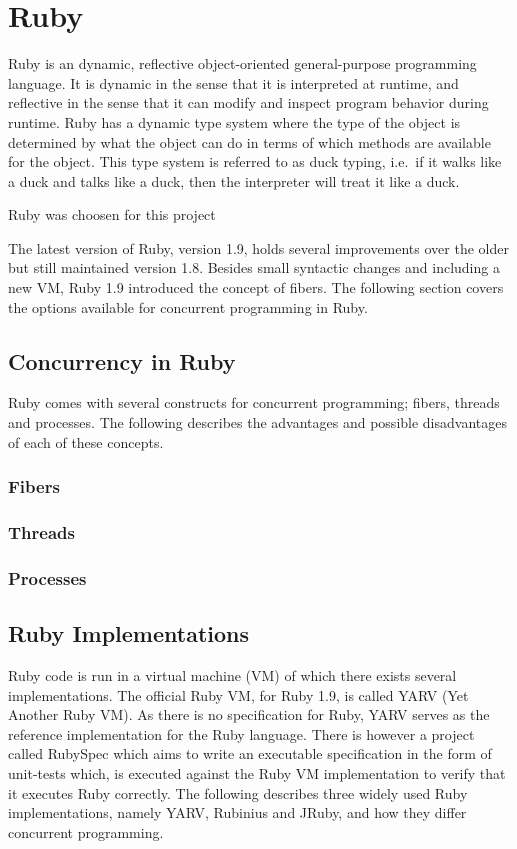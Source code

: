 \section{Ruby} %
\label{sec:ruby}

Ruby is an dynamic, reflective object-oriented general-purpose programming
language. It is dynamic in the sense that it is interpreted at runtime, and
reflective in the sense that it can modify and inspect program behavior during
runtime.  Ruby has a dynamic type system where the type of the object is
determined by what the object can do in terms of which methods are available
for the object. This type system is referred to as duck typing, i.e.\ if it
walks like a duck and talks like a duck, then the interpreter will treat it
like a duck.

Ruby was choosen for this project

The latest version of Ruby, version 1.9, holds several improvements over the
older but still maintained version 1.8. Besides small syntactic changes and
including a new VM, Ruby 1.9 introduced the concept of fibers.  The following
section covers the options available for concurrent programming in Ruby.

\subsection{Concurrency in Ruby}
Ruby comes with several constructs for concurrent programming; fibers, threads
and processes. The following describes the advantages and possible disadvantages
of each of these concepts.

\subsubsection{Fibers}

\subsubsection{Threads}

\subsubsection{Processes}


\subsection{Ruby Implementations}
Ruby code is run in a virtual machine (VM) of which there exists several
implementations. The official Ruby VM, for Ruby 1.9, is called YARV (Yet 
Another Ruby VM). As there is no specification for Ruby, YARV serves as
the reference implementation for the Ruby language.  There is however a
project called RubySpec which aims to write an executable specification in the
form of unit-tests which, is executed against the Ruby VM implementation to
verify that it executes Ruby correctly. The following describes three widely
used Ruby implementations, namely YARV, Rubinius and JRuby, and how they
differ concurrent programming.

